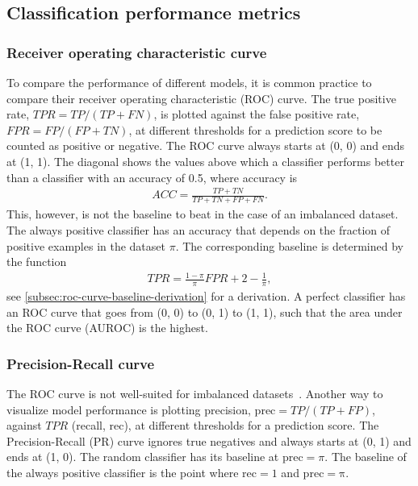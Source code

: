 \subsection{Classification performance metrics}

\subsubsection{Receiver operating characteristic curve}

To compare the performance of different models, it is common practice to compare their receiver operating characteristic (ROC) curve.
The true positive rate, $TPR = TP / (TP + FN)$, is plotted against the false positive rate, $FPR = FP / (FP + TN)$, at different thresholds for a prediction score to be counted as positive or negative.
The ROC curve always starts at (0, 0) and ends at (1, 1).
The diagonal shows the values above which a classifier performs better than a classifier with an accuracy of 0.5, where accuracy is
\begin{align}
    ACC = \frac{TP + TN}{TP + TN + FP + FN}.
\end{align}
This, however, is not the baseline to beat in the case of an imbalanced dataset.
The always positive classifier has an accuracy that depends on the fraction of positive examples in the dataset $\pi$.
The corresponding baseline is determined by the function
\begin{align}
    TPR = \frac{1 - \pi}{\pi} FPR + 2 - \frac{1}{\pi},
\end{align}
see \cref{subsec:roc-curve-baseline-derivation} for a derivation.
A perfect classifier has an ROC curve that goes from (0, 0) to (0, 1) to (1, 1), such that the area under the ROC curve (AUROC) is the highest.

\subsubsection{Precision-Recall curve}
The ROC curve is not well-suited for imbalanced datasets~.
Another way to visualize model performance is plotting precision, $\mathrm{prec} = TP / (TP + FP)$, against $TPR$ (recall, rec), at different thresholds for a prediction score.
The Precision-Recall (PR) curve ignores true negatives and always starts at (0, 1) and ends at (1, 0).
The random classifier has its baseline at $\mathrm{prec} = \pi$.
The baseline of the always positive classifier is the point where $\mathrm{rec} = 1$ and $\mathrm{prec = \pi}$.

